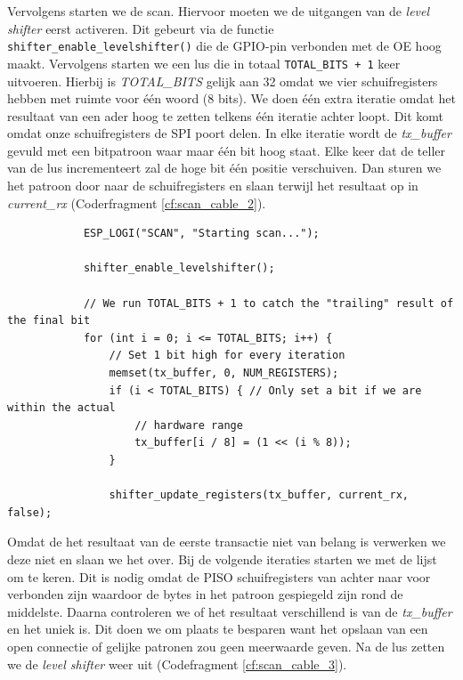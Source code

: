 Vervolgens starten we de scan. Hiervoor moeten we de uitgangen van de \textit{level shifter} eerst activeren. Dit gebeurt via de functie \lstinline|shifter_enable_levelshifter()| die de \gls{GPIO}-pin verbonden met de OE hoog maakt. Vervolgens starten we een lus die in totaal \lstinline|TOTAL_BITS + 1| keer uitvoeren. Hierbij is \textit{TOTAL\_BITS} gelijk aan 32 omdat we vier schuifregisters hebben met ruimte voor één woord (8 bits). We doen één extra iteratie omdat het resultaat van een ader hoog te zetten telkens één iteratie achter loopt. Dit komt omdat onze schuifregisters de \gls{SPI} poort delen. In elke iteratie wordt de \textit{tx\_buffer} gevuld met een bitpatroon waar maar één bit hoog staat. Elke keer dat de teller van de lus incrementeert zal de hoge bit één positie verschuiven. Dan sturen we het patroon door naar de schuifregisters en slaan terwijl het resultaat op in \textit{current\_rx} (Coderfragment \ref{cf:scan_cable_2}).

\begin{listing}[H]
    \begin{verbatim}
            ESP_LOGI("SCAN", "Starting scan...");
            
            shifter_enable_levelshifter();
            
            // We run TOTAL_BITS + 1 to catch the "trailing" result of the final bit
            for (int i = 0; i <= TOTAL_BITS; i++) {
                // Set 1 bit high for every iteration
                memset(tx_buffer, 0, NUM_REGISTERS);
                if (i < TOTAL_BITS) { // Only set a bit if we are within the actual
                    // hardware range
                    tx_buffer[i / 8] = (1 << (i % 8));
                }
                
                shifter_update_registers(tx_buffer, current_rx, false);
    \end{verbatim}
    \caption[scan\_cable pt 2]{Code van de functie die de kabels inleest deel 2.}
    \label{cf:scan_cable_2}
\end{listing}

Omdat de het resultaat van de eerste transactie niet van belang is verwerken we deze niet en slaan we het over. Bij de volgende iteraties starten we met de lijst om te keren. Dit is nodig omdat de \gls{PISO} schuifregisters van achter naar voor verbonden zijn waardoor de bytes in het patroon gespiegeld zijn rond de middelste. Daarna controleren we of het resultaat verschillend is van de \textit{tx\_buffer} en het uniek is. Dit doen we om plaats te besparen want het opslaan van een open connectie of gelijke patronen zou geen meerwaarde geven. Na de lus zetten we de \textit{level shifter} weer uit (Codefragment \ref{cf:scan_cable_3}). 

